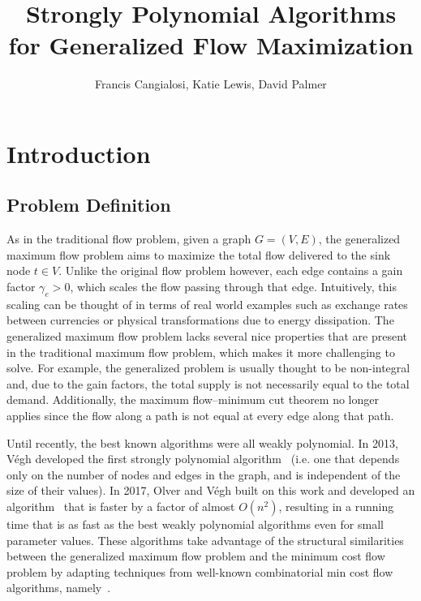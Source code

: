 \documentclass[11pt]{article}
\title{Strongly Polynomial Algorithms for Generalized Flow Maximization}
\author{Francis Cangialosi, Katie Lewis, David Palmer}
\date{}
\theoremstyle{definition}
\theoremstyle{definition}
\begin{document}
\maketitle
\section{Introduction}\label{sec:intro}
	\subsection{Problem Definition}\label{sec:problem}
	As in the traditional flow problem, given a
	graph $G = (V,E)$, the generalized maximum flow problem aims to maximize the
	total flow delivered to the sink node $t \in V$. Unlike the original flow
	problem however, each edge contains a gain factor $\gamma_e > 0$, which scales
	the flow passing through that edge. Intuitively, this scaling can be thought
	of in terms of real world examples such as exchange rates between currencies
	or physical transformations due to energy dissipation. The generalized maximum
	flow problem lacks several nice properties that are present in the traditional
	maximum flow problem, which makes it more challenging to solve. For example,
	the generalized problem is usually thought to be non-integral and,
	due to the gain factors, the total supply is not necessarily equal to the total
	demand. Additionally, the maximum flow--minimum cut theorem no longer applies
	since the flow along a path is not equal at every edge along that path.
    
	Until recently, the best known algorithms were all weakly polynomial. In
	2013, Végh developed the first strongly polynomial algorithm~\cite{Vegh2013}
	(i.e. one that depends only on the number of nodes and edges in the graph,
	and is independent of the size of their values). In 2017, Olver and Végh
	built on this work and developed an algorithm~\cite{Olver2017}
    that is faster by a factor of
	almost $O(n^2)$, resulting in a running time that is as fast as the best
	weakly polynomial algorithms even for small parameter values. These
	algorithms take advantage of the structural similarities between the
	generalized maximum flow problem and the minimum cost flow problem by
	adapting techniques from well-known combinatorial min cost flow algorithms,
    namely~\cite{Orlin1988}.
    
\end{document}
